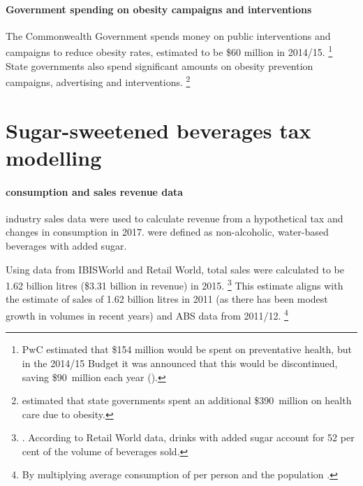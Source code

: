\documentclass[embargoed]{grattan}
\begin{document}
\subsubsection{Government spending on obesity campaigns and interventions}\label{government-spending-on-obesity-campaigns-and-interventions}

The Commonwealth Government spends money on public interventions and campaigns to reduce obesity rates, estimated to be \$60 million in 2014/15.%
\footnote{PwC estimated that \$154 million would be spent on preventative health, but in the 2014/15 Budget it was announced that this would be discontinued, saving \$90~million each year (\textcites{PwC2015Weighingcostobesity}{Treasury2016201617BudgetBudget}).} State governments also spend significant amounts on obesity prevention campaigns, advertising and interventions.%
\footnote{\textcite{PwC2015Weighingcostobesity} estimated that state governments spent an additional \$390~million on health care due to obesity.}

\chapter{Sugar-sweetened beverages tax modelling}\label{appendix-3-modelling-sugar-sweetened-beverages-tax-options}

\subsubsection{\SSB{} consumption and sales revenue data}\label{ssb-consumption-and-sales-revenue-data}

\SSB{} industry sales data were used to calculate revenue from a hypothetical \SSB{} tax and changes in \SSB{} consumption in 2017.
\SSBs{} were defined as non-alcoholic, water-based beverages with added sugar.

Using data from IBISWorld and Retail World, total \SSB{} sales were calculated to be 1.62 billion litres (\$3.31 billion in revenue) in 2015.%
\footnote{\textcites{Media2015RetailWorldAnnual}{IBISWorld2016FruitJuiceDrink}{IBISWorld2016SoftDrinkManufacturing}.
According to Retail World data, drinks with added sugar account for 52 per cent of the volume of beverages sold.} 
This estimate aligns with the \textcite{Levy2014QuenchingAustraliasthirst} estimate of \SSB{} sales of 1.62 billion litres in 2011 (as there has been modest growth in \SSB{} volumes in recent years) and ABS data from 2011/12.%
\footnote{By multiplying average consumption of \SSBs{} per person and the population \textcite{ABS20144364055007AustralianHealth}.}
\end{document}
